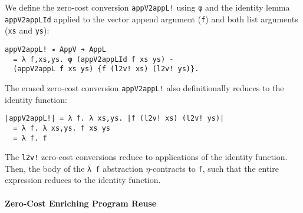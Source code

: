 \documentclass[acmsmall]{acmart}\settopmatter{}
\begin{document}
We define the zero-cost conversion \verb;appV2appL!; using \verb;φ; and
the identity lemma \verb;appV2appLId; applied to the vector append
argument (\verb;f;) and both list arguments (\verb;xs; and \verb;ys;):
\begin{verbatim}
appV2appL! ◂ AppV ➔ AppL
  = λ f,xs,ys. φ (appV2appLId f xs ys) - 
  (appV2appL f xs ys) {f (l2v! xs) (l2v! ys)}.
\end{verbatim}
The erased zero-cost conversion \verb;appV2appL!; also definitionally
reduces to the identity function:
\begin{verbatim}
|appV2appL!| = λ f. λ xs,ys. |f (l2v! xs) (l2v! ys)|
  = λ f. λ xs,ys. f xs ys 
  = λ f. f
\end{verbatim}
The \verb;l2v!; zero-cost conversions reduce to applications of the
identity function. Then, the body of the \verb;λ f; abstraction
$\eta$-contracts to \verb;f;, such that the entire expression reduces
to the identity function.

\paragraph{Zero-Cost Enriching Program Reuse}
\end{document}
